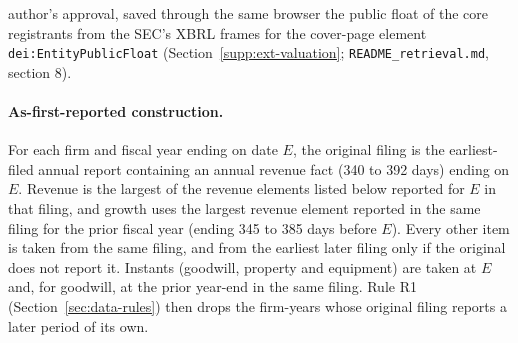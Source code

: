 author's approval, saved through the same browser the public float of the core registrants from the SEC's XBRL frames for the cover-page element \texttt{dei:EntityPublicFloat} (Section~\ref{supp:ext-valuation}; \texttt{README\_retrieval.md}, section 8).

\paragraph{As-first-reported construction.} For each firm and fiscal year ending on date $E$, the original filing is the earliest-filed annual report containing an annual revenue fact (340 to 392 days) ending on $E$. Revenue is the largest of the revenue elements listed below reported for $E$ in that filing, and growth uses the largest revenue element reported in the same filing for the prior fiscal year (ending 345 to 385 days before $E$). Every other item is taken from the same filing, and from the earliest later filing only if the original does not report it. Instants (goodwill, property and equipment) are taken at $E$ and, for goodwill, at the prior year-end in the same filing. Rule R1 (Section~\ref{sec:data-rules}) then drops the firm-years whose original filing reports a later period of its own.

